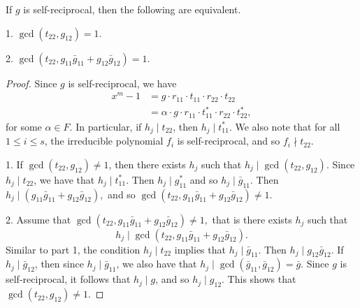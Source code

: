 \documentclass[a4paper,12pt]{article}
\begin{document}
\begin{lemma} \label{1a} If $g$ is self-reciprocal, then the following are equivalent.

1. $\gcd(t_{22},g_{12})=1$. 

2. $\gcd \left( t_{22},  g_{11}\bar{g}_{11}+g_{12} \bar{g}_{12}\right)=1.$
\end{lemma}
\begin{proof} Since $g$ is self-reciprocal, we have 
\begin{align*}
x^m-1 &= g \cdot  r_{11} \cdot t_{11} \cdot r_{22} \cdot t_{22} \\
    &= \alpha \cdot g \cdot r_{11} \cdot t_{11}^* \cdot r_{22} \cdot t_{22}^*,
\end{align*}
for some $\alpha \in F$. In particular, if   $h_j \mid t_{22}$, then $h_j \mid t_{11}^*$. 
We also note that for all $1 \le i \le s$, the irreducible polynomial $f_i$ is self-reciprocal, and so $f_i \nmid t_{22}$.  

1.  If $\gcd(t_{22},g_{12}) \ne 1$, then there exists $h_j$ such that $h_j \mid \gcd(t_{22},g_{12})$.   
Since $h_j \mid t_{22}$, we have that $h_j\mid t_{11}^* $. Then $h_j \mid g_{11}^*$ and so  $h_j \mid \bar{g}_{11}$. Then
$
h_j \mid  (g_{11}\bar{g}_{11}+g_{12} \bar{g}_{12}), 
$
and so $\gcd \left( t_{22},  g_{11}\bar{g}_{11}+g_{12} \bar{g}_{12}\right) \ne 1.$

2. Assume that $\gcd \left( t_{22},  g_{11}\bar{g}_{11}+g_{12} \bar{g}_{12}\right) \ne 1,$ that is    there exists $h_j$ such that 
\[ 
h_j \mid \gcd \left( t_{22},  g_{11}\bar{g}_{11}+g_{12} \bar{g}_{12}\right).
\]
Similar to part 1, the condition $h_j \mid t_{22}$ implies that $h_j \mid \bar{g}_{11}$. Then $h_j \mid g_{12} \bar{g}_{12}$. If $h_j  \mid\bar{g}_{12}$, then since $h_j \mid \bar{g}_{11}$, we also have that $h_j \mid \gcd(\bar{g}_{11}, \bar{g}_{12}) = \bar{g}$. Since $g$ is self-reciprocal, it follows that  $h_j \mid g$, and so $h_j \mid g_{12}$. This shows that $\gcd(t_{22},g_{12}) \ne 1$. \qedhere 
\end{proof}
\end{document}
